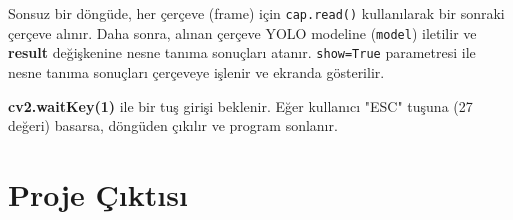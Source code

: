 \documentclass[11pt,a4paper]{report}
\begin{document}
	Sonsuz bir döngüde, her çerçeve (frame) için \texttt{cap.read()} kullanılarak bir sonraki çerçeve alınır. Daha sonra, alınan çerçeve YOLO modeline (\texttt{model}) iletilir ve \textbf{result} değişkenine nesne tanıma sonuçları atanır. \texttt{show=True} parametresi ile nesne tanıma sonuçları çerçeveye işlenir ve ekranda gösterilir.
	\newline
	
	\textbf{cv2.waitKey(1)} ile bir tuş girişi beklenir. Eğer kullanıcı "ESC" tuşuna (27 değeri) basarsa, döngüden çıkılır ve program sonlanır.\cite{Nesne-Tanımlama}
	
	\clearpage
	
	\section{Proje Çıktısı}
	
\end{document}
